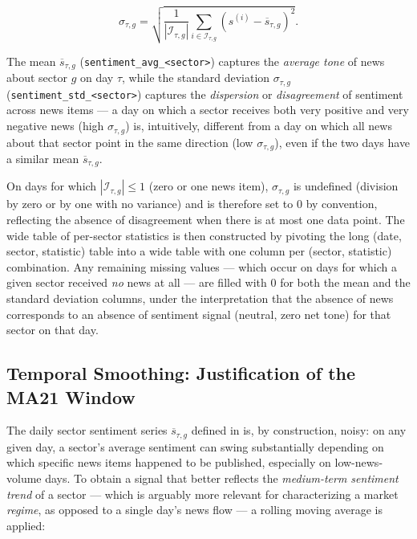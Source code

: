 \begin{equation}
  \label{eq:sector-std}
  \sigma_{\tau,g} = \sqrt{\frac{1}{|\mathcal{I}_{\tau,g}|}
  \sum_{i \in \mathcal{I}_{\tau,g}} \left(s^{(i)} - \overline{s}_{\tau,g}\right)^2}.
\end{equation}

The mean $\overline{s}_{\tau,g}$ (\texttt{sentiment\_avg\_<sector>})
captures the \emph{average tone} of news about sector $g$ on day $\tau$,
while the standard deviation $\sigma_{\tau,g}$
(\texttt{sentiment\_std\_<sector>}) captures the \emph{dispersion} or
\emph{disagreement} of sentiment across news items --- a day on which a
sector receives both very positive and very negative news (high
$\sigma_{\tau,g}$) is, intuitively, different from a day on which all news
about that sector point in the same direction (low $\sigma_{\tau,g}$),
even if the two days have a similar mean $\overline{s}_{\tau,g}$.

On days for which $|\mathcal{I}_{\tau,g}| \le 1$ (zero or one news item),
$\sigma_{\tau,g}$ is undefined (division by zero or by one with no
variance) and is therefore set to $0$ by convention, reflecting the
absence of disagreement when there is at most one data point. The wide
table of per-sector statistics is then constructed by pivoting the long
(date, sector, statistic) table into a wide table with one column per
(sector, statistic) combination. Any remaining missing values --- which
occur on days for which a given sector received \emph{no} news at all ---
are filled with $0$ for both the mean and the standard deviation columns,
under the interpretation that the absence of news corresponds to an
absence of sentiment signal (neutral, zero net tone) for that
sector on that day.

\subsection{Temporal Smoothing: Justification of the MA21 Window}
\label{sec:meth-smoothing}

The daily sector sentiment series $\overline{s}_{\tau,g}$ defined in
 is, by construction, noisy: on any given day, a
sector's average sentiment can swing substantially depending on which
specific news items happened to be published, especially on
low-news-volume days. To obtain a signal that better reflects the
\emph{medium-term sentiment trend} of a sector --- which is arguably more
relevant for characterizing a market \emph{regime}, as opposed to a
single day's news flow --- a rolling moving average is applied:

